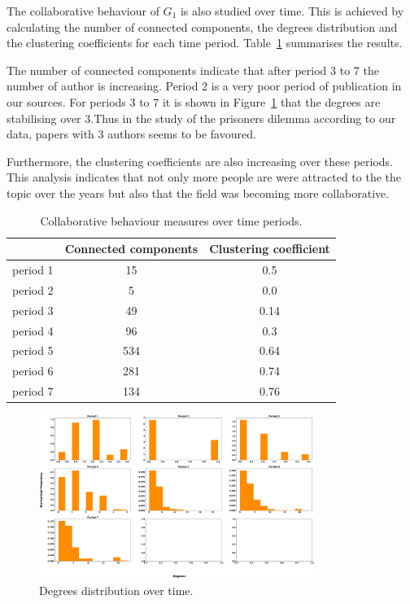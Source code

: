 \documentclass{article}
\theoremstyle{definition}
\begin{document}
The collaborative behaviour of \(G_1\) is also studied over time. This is achieved
by calculating the number of connected components, the degrees distribution
and the clustering coefficients for each time period. Table~\ref{table:cc_over_time}
summarises the results.

The number of connected components indicate that after period 3 to 7 the 
number of author is increasing. Period 2 is a very poor period of publication
in our sources. For periods 3 to 7 it is shown in Figure~\ref{fig:dist_over_time}
that the degrees are stabilising over 3.Thus in the study of the prisoners dilemma
according to our data, papers with 3 authors seems to be favoured.

Furthermore, the clustering coefficients are also increasing over these periods.
This analysis indicates that not only more people are were attracted to the
the topic over the years but also that the field was becoming more collaborative.

\begin{table}[!hbtp]
    \begin{center}
    \begin{tabular}{lcc}
        \toprule
                  & \textbf{Connected components} & \textbf{Clustering coefficient}\\
        \midrule
        period 1  & 15                            & 0.5 \\
        period 2  & 5                             & 0.0 \\
        period 3  & 49                            & 0.14 \\
        period 4  & 96                            & 0.3 \\
        period 5  & 534                           & 0.64 \\
        period 6  & 281                           & 0.74 \\
        period 7  & 134                           & 0.76 \\
        \bottomrule
    \end{tabular}
    \end{center}
    \caption{Collaborative behaviour measures over time periods.}
    \label{table:cc_over_time}
\end{table}

\begin{figure}[!hbtp]
    \centering
    \includegraphics[width=0.8\textwidth]{./assets/images/degrees_histrograms_temporal.pdf}
    \caption{Degrees distribution over time.}\label{fig:dist_over_time}
\end{figure}
\end{document}
